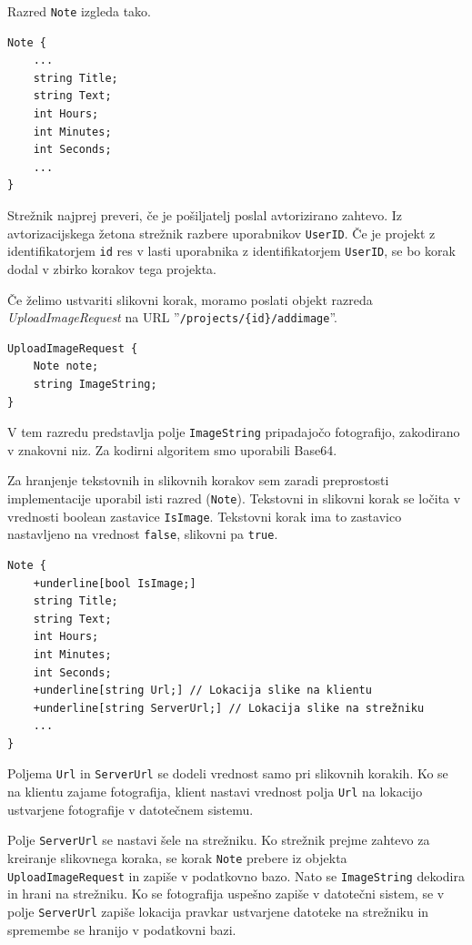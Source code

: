 \documentclass[a4paper, 12pt]{book}
\begin{document}
\noindent Razred \texttt{Note} izgleda tako.

\begin{verbatim}
Note { 
    ... 
    string Title; 
    string Text; 
    int Hours; 
    int Minutes;
    int Seconds;
    ...
}
\end{verbatim}

Strežnik najprej preveri, če je pošiljatelj poslal avtorizirano zahtevo.
Iz avtorizacijskega žetona strežnik razbere uporabnikov \texttt{UserID}. 
Če je projekt z identifikatorjem \texttt{id} res v lasti uporabnika z identifikatorjem \texttt{UserID}, se bo korak dodal v zbirko korakov tega projekta.

Če želimo ustvariti slikovni korak, moramo poslati objekt razreda \textit{UploadImageRequest} na URL ''\texttt{/projects/\{id\}/addimage}''.

\begin{verbatim}
UploadImageRequest { 
    Note note; 
    string ImageString; 
}
\end{verbatim}

V tem razredu predstavlja polje \texttt{ImageString} pripadajočo fotografijo, zakodirano v znakovni niz.
Za kodirni algoritem smo uporabili Base64.

Za hranjenje tekstovnih in slikovnih korakov sem zaradi preprostosti implementacije uporabil isti razred (\texttt{Note}).
Tekstovni in slikovni korak se ločita v vrednosti boolean zastavice \texttt{IsImage}.
Tekstovni korak ima to zastavico nastavljeno na vrednost \texttt{false}, slikovni pa \texttt{true}.

\begin{Verbatim}[commandchars=+\[\]]
Note { 
    +underline[bool IsImage;]
    string Title; 
    string Text; 
    int Hours; 
    int Minutes;
    int Seconds; 
    +underline[string Url;] // Lokacija slike na klientu
    +underline[string ServerUrl;] // Lokacija slike na strežniku
    ... 
}
\end{Verbatim}

Poljema \texttt{Url} in \texttt{ServerUrl} se dodeli vrednost samo pri slikovnih korakih.
Ko se na klientu zajame fotografija, klient nastavi vrednost polja \texttt{Url} na lokacijo ustvarjene fotografije v datotečnem sistemu.

Polje \texttt{ServerUrl} se nastavi šele na strežniku.
Ko strežnik prejme zahtevo za kreiranje slikovnega koraka, se korak \texttt{Note} prebere iz objekta \texttt{UploadImageRequest} in zapiše v podatkovno bazo.
Nato se \texttt{ImageString} dekodira in hrani na strežniku.
Ko se fotografija uspešno zapiše v datotečni sistem, se v polje \texttt{ServerUrl} zapiše lokacija pravkar ustvarjene datoteke na strežniku in spremembe se hranijo v podatkovni bazi.
\end{document}
